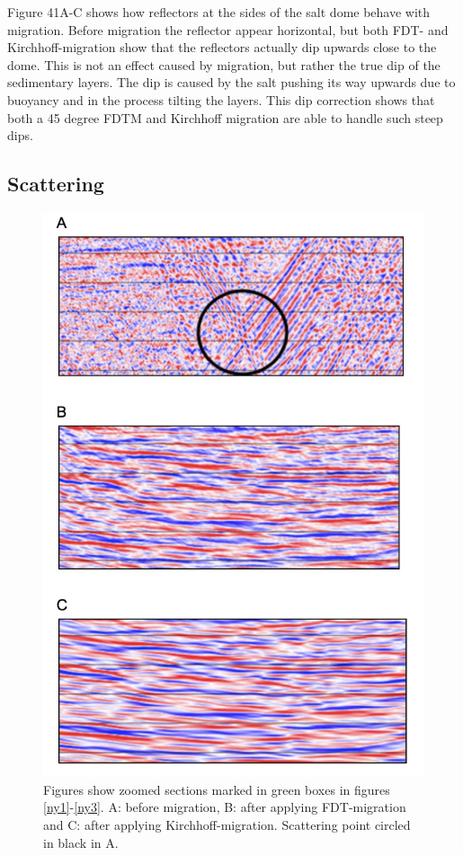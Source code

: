 \documentclass[10pt,a4paper]{article}
\begin{document}
Figure 41A-C shows how reflectors at the sides of the salt dome behave with migration. Before migration the reflector appear horizontal, but both FDT- and Kirchhoff-migration show that the reflectors actually dip upwards close to the dome. This is not an effect caused by migration, but rather the true dip of the sedimentary layers. The dip is caused by the salt pushing its way upwards due to buoyancy and in the process tilting the layers. This dip correction shows that both a 45 degree FDTM and Kirchhoff migration are able to handle such steep dips. 

\subsection{Scattering}

\begin{figure}[H]
\includegraphics[scale=0.4]{ny7.jpg}
\caption{Figures show zoomed sections marked in green boxes in figures \ref{ny1}-\ref{ny3}. 
A: before migration, B: after applying FDT-migration and C: after applying Kirchhoff-migration. Scattering point circled in black in A.}
\label{ny7}
\end{figure}
\end{document}
